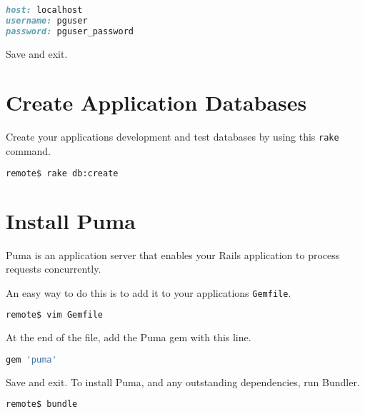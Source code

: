 \begin{minipage}{\linewidth}
  \begin{lstlisting}[language=ruby, caption={config/database.yml}]
host: localhost
username: pguser
password: pguser_password
\end{lstlisting}
\end{minipage}

Save and exit.

\section{Create Application Databases}

Create your application\textquotesingle s development and test databases by using this \texttt{rake} command.

\begin{minipage}{\linewidth}
\begin{lstlisting}[language=bash]
remote$ rake db:create
\end{lstlisting}
\end{minipage}

\section{Install Puma}

Puma is an application server that enables your Rails application
to process requests concurrently.

An easy way to do this is to add it to your application\textquotesingle s \texttt{Gemfile}.

\begin{minipage}{\linewidth}
\begin{lstlisting}[language=bash]
remote$ vim Gemfile
\end{lstlisting}
\end{minipage}

At the end of the file, add the Puma gem with this line.

\begin{minipage}{\linewidth}
  \begin{lstlisting}[language=ruby, caption={Gemfile}]
gem 'puma'
\end{lstlisting}
\end{minipage}

Save and exit. To install Puma, and any outstanding dependencies, run Bundler.

\begin{minipage}{\linewidth}
\begin{lstlisting}[language=bash]
remote$ bundle
\end{lstlisting}
\end{minipage}

